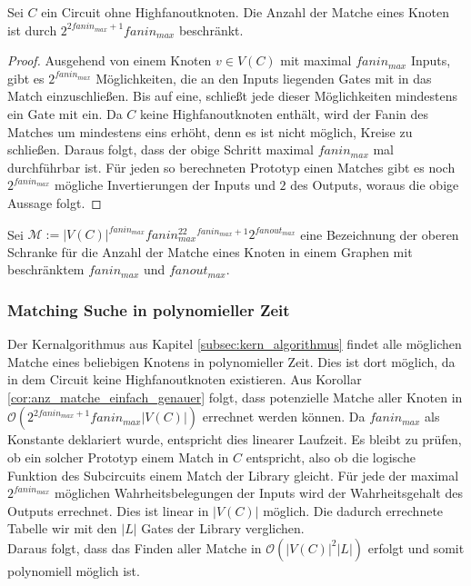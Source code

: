 \documentclass[11pt, a4paper, german]{article}
\begin{document}
\begin{cor}\label{cor:anz_matche_einfach_genauer}
Sei $C$ ein Circuit ohne Highfanoutknoten. Die Anzahl der Matche eines Knoten ist durch $2^{2fanin_{max} +1}fanin_{max}$ beschränkt.
\end{cor}
\begin{proof}
Ausgehend von einem Knoten $v \in V(C)$ mit maximal $fanin_{max}$ Inputs, gibt es  $2^{fanin_{max}}$ Möglichkeiten, die an den Inputs liegenden Gates mit in das Match einzuschließen. Bis auf eine, schließt jede dieser Möglichkeiten mindestens ein Gate mit ein. Da $C$ keine Highfanoutknoten enthält, wird der Fanin des Matches um mindestens eins erhöht, denn es ist nicht möglich, Kreise zu schließen. Daraus folgt, dass der obige Schritt maximal $fanin_{max}$ mal durchführbar ist. Für jeden so berechneten Prototyp einen Matches gibt es noch $2^{fanin_{max}}$ mögliche Invertierungen der Inputs und $2$ des Outputs, woraus die obige Aussage folgt.
\end{proof}
\begin{definition}
Sei $\mathcal{M}:= |V(C)|^{fanin_{max}} fanin_{max}^22^{fanin_{max}+1}2^{fanout_{max}}$ eine Bezeichnung der oberen Schranke für die Anzahl der Matche eines Knoten in einem Graphen mit beschränktem $fanin_{max}$ und $fanout_{max}$.
\end{definition}

\subsubsection{Matching Suche in polynomieller Zeit}
\label{subsubsec:pol_match_suche}
Der Kernalgorithmus aus Kapitel \ref{subsec:kern_algorithmus} findet alle möglichen Matche eines beliebigen Knotens in polynomieller Zeit. Dies ist dort möglich, da in dem Circuit keine Highfanoutknoten existieren. Aus Korollar \ref{cor:anz_matche_einfach_genauer} folgt, dass potenzielle Matche aller Knoten  in $\mathcal{O}(2^{2fanin_{max} +1}fanin_{max} |V(C)|)$ errechnet werden können. Da $fanin_{max}$ als Konstante deklariert wurde, entspricht dies linearer Laufzeit. Es bleibt zu prüfen, ob  ein solcher Prototyp einem Match in $C$ entspricht, also ob die logische Funktion des Subcircuits einem Match der Library gleicht. Für jede der maximal $2^{fanin_{max}}$ möglichen Wahrheitsbelegungen der Inputs wird der Wahrheitsgehalt des Outputs errechnet. Dies ist linear in $|V(C)|$ möglich. Die dadurch errechnete Tabelle wir mit den $|L|$ Gates der Library verglichen. \\
Daraus folgt, dass das Finden aller Matche in $\mathcal{O}(|V(C)|^2|L|)$ erfolgt und somit polynomiell möglich ist.
\end{document}
